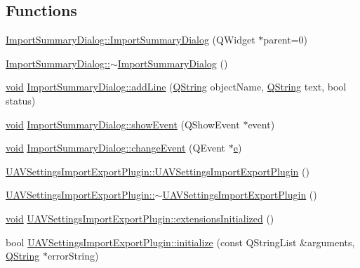 \subsection*{Functions}
\begin{DoxyCompactItemize}
\item 
\hyperlink{group___u_a_v_settings_import_export_ga715ec099ff29a7acc3887e20f22219da}{Import\-Summary\-Dialog\-::\-Import\-Summary\-Dialog} (Q\-Widget $\ast$parent=0)
\item 
\hyperlink{group___u_a_v_settings_import_export_gaf410b79676dfd8f6636650a3d9ef48e2}{Import\-Summary\-Dialog\-::$\sim$\-Import\-Summary\-Dialog} ()
\item 
\hyperlink{group___u_a_v_objects_plugin_ga444cf2ff3f0ecbe028adce838d373f5c}{void} \hyperlink{group___u_a_v_settings_import_export_ga16fa18af8950ac368ac63851b4c8e409}{Import\-Summary\-Dialog\-::add\-Line} (\hyperlink{group___u_a_v_objects_plugin_gab9d252f49c333c94a72f97ce3105a32d}{Q\-String} object\-Name, \hyperlink{group___u_a_v_objects_plugin_gab9d252f49c333c94a72f97ce3105a32d}{Q\-String} text, bool status)
\item 
\hyperlink{group___u_a_v_objects_plugin_ga444cf2ff3f0ecbe028adce838d373f5c}{void} \hyperlink{group___u_a_v_settings_import_export_gad8e0a82289892d886b2e350ea7dd1faf}{Import\-Summary\-Dialog\-::show\-Event} (Q\-Show\-Event $\ast$event)
\item 
\hyperlink{group___u_a_v_objects_plugin_ga444cf2ff3f0ecbe028adce838d373f5c}{void} \hyperlink{group___u_a_v_settings_import_export_ga31da7a0667d03f1e71cd5012bee5b544}{Import\-Summary\-Dialog\-::change\-Event} (Q\-Event $\ast$\hyperlink{_o_p_plots_8m_a9425be9aab51621e317ba7ade564b570}{e})
\item 
\hyperlink{group___u_a_v_settings_import_export_gad19bf02649bc86e8245c1ad401db02b7}{U\-A\-V\-Settings\-Import\-Export\-Plugin\-::\-U\-A\-V\-Settings\-Import\-Export\-Plugin} ()
\item 
\hyperlink{group___u_a_v_settings_import_export_ga14bcad14e65bb435b384bc26e367f553}{U\-A\-V\-Settings\-Import\-Export\-Plugin\-::$\sim$\-U\-A\-V\-Settings\-Import\-Export\-Plugin} ()
\item 
\hyperlink{group___u_a_v_objects_plugin_ga444cf2ff3f0ecbe028adce838d373f5c}{void} \hyperlink{group___u_a_v_settings_import_export_ga8cbd9cce7f1b58c44d6dfdef36b50f81}{U\-A\-V\-Settings\-Import\-Export\-Plugin\-::extensions\-Initialized} ()
\item 
bool \hyperlink{group___u_a_v_settings_import_export_ga78fbb80d8d70b2e76652a80594215faf}{U\-A\-V\-Settings\-Import\-Export\-Plugin\-::initialize} (const Q\-String\-List \&arguments, \hyperlink{group___u_a_v_objects_plugin_gab9d252f49c333c94a72f97ce3105a32d}{Q\-String} $\ast$error\-String)

\end{DoxyCompactItemize}
